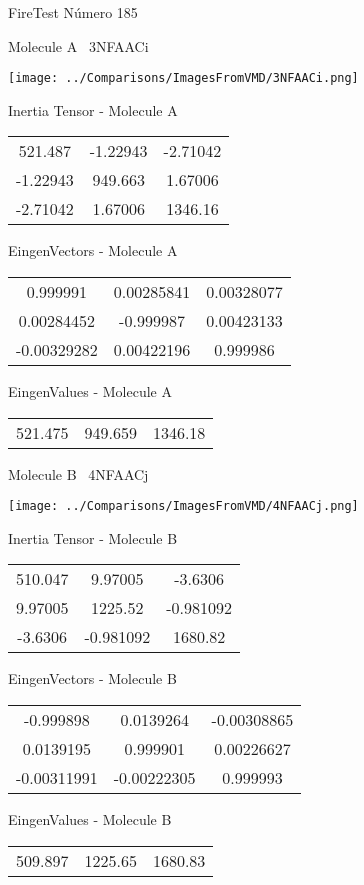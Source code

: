\vtab[-3cm]
\begin{center}
{\large FireTest \tab Número 185}
\end{center}
\begin{multicols}{2}
\begin{center}

Molecule A \
3NFAACi

\texttt{[image: ../Comparisons/ImagesFromVMD/3NFAACi.png]}

Inertia Tensor - Molecule A \\
\begin{tabular}{|c c c|}
521.487	 & 	-1.22943	 & 	-2.71042	 \\
-1.22943	 & 	949.663	 & 	1.67006	 \\
-2.71042	 & 	1.67006	 & 	1346.16
\end{tabular}

\vtab
 EingenVectors - Molecule A     \\
\begin{tabular}{|c c c|}
0.999991	 & 	0.00285841	 & 	0.00328077	 \\
0.00284452	 & 	-0.999987	 & 	0.00423133	 \\
-0.00329282	 & 	0.00422196	 & 	0.999986
\end{tabular}

\vtab
 EingenValues - Molecule A     \\
\begin{tabular}{|c c c|}
521.475	 & 	949.659	 & 	1346.18	 \\
\end{tabular}
\columnbreak

Molecule B \
4NFAACj

\texttt{[image: ../Comparisons/ImagesFromVMD/4NFAACj.png]}

Inertia Tensor - Molecule B \\
\begin{tabular}{|c c c|}
510.047	 & 	9.97005	 & 	-3.6306	 \\
9.97005	 & 	1225.52	 & 	-0.981092	 \\
-3.6306	 & 	-0.981092	 & 	1680.82
\end{tabular}

\vtab
 EingenVectors - Molecule B     \\
\begin{tabular}{|c c c|}
-0.999898	 & 	0.0139264	 & 	-0.00308865	 \\
0.0139195	 & 	0.999901	 & 	0.00226627	 \\
-0.00311991	 & 	-0.00222305	 & 	0.999993
\end{tabular}

\vtab
 EingenValues - Molecule B     \\
\begin{tabular}{|c c c|}
509.897	 & 	1225.65	 & 	1680.83	 \\
\end{tabular}

\end{center}
\end{multicols}

